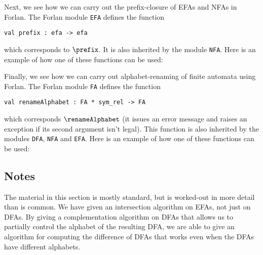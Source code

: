 Next, we see how we can carry out the prefix-closure of EFAs and NFAs in
Forlan.  The Forlan module \texttt{EFA} defines the function
\begin{verbatim}
val prefix : efa -> efa
\end{verbatim}
%
which corresponds to $\prefix$.
%
%
%
%
%
%
%
It is also inherited by the module \texttt{NFA}.
%
Here is an example of how one of these functions can be used:


Finally, we see how we can carry out alphabet-renaming of finite
automata using Forlan.
The Forlan module \texttt{FA} defines the function
\begin{verbatim}
val renameAlphabet : FA * sym_rel -> FA
\end{verbatim}
%
which corresponds $\renameAlphabet$ (it issues an error message and
%
%
%
%
%
raises an exception if its second argument isn't legal).
This function is also inherited by the modules \texttt{DFA},
\texttt{NFA} and \texttt{EFA}.
%
%
Here is an example of how one of these functions can be used:


\subsection{Notes}

The material in this section is mostly standard, but is worked-out in
more detail than is common.  We have given an intersection algorithm
on EFAs, not just on DFAs.  By giving a complementation algorithm on
DFAs that allows us to partially control the alphabet of the resulting
DFA, we are able to give an algorithm for computing the difference of
DFAs that works even when the DFAs have different alphabets.

